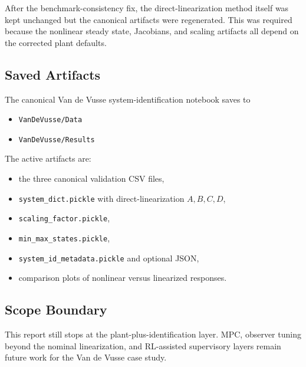 After the benchmark-consistency fix, the direct-linearization method itself was kept unchanged but the canonical artifacts were regenerated. This was required because the nonlinear steady state, Jacobians, and scaling artifacts all depend on the corrected plant defaults.

\subsection{Saved Artifacts}

The canonical Van de Vusse system-identification notebook saves to
\begin{itemize}
    \item \texttt{VanDeVusse/Data}
    \item \texttt{VanDeVusse/Results}
\end{itemize}

The active artifacts are:
\begin{itemize}
    \item the three canonical validation CSV files,
    \item \texttt{system\_dict.pickle} with direct-linearization \(A, B, C, D\),
    \item \texttt{scaling\_factor.pickle},
    \item \texttt{min\_max\_states.pickle},
    \item \texttt{system\_id\_metadata.pickle} and optional JSON,
    \item comparison plots of nonlinear versus linearized responses.
\end{itemize}

\subsection{Scope Boundary}

This report still stops at the plant-plus-identification layer. MPC, observer tuning beyond the nominal linearization, and RL-assisted supervisory layers remain future work for the Van de Vusse case study.
